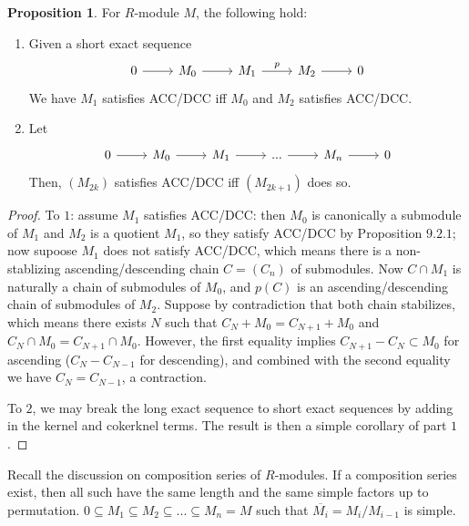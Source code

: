 \documentclass{article}
\theoremstyle{definition}
\theoremstyle{definition}
\theoremstyle{definition}
\newtheorem{proposition}{Proposition}[section]
\theoremstyle{definition}
\theoremstyle{definition}
\theoremstyle{definition}
\theoremstyle{definition}
\begin{document}
\begin{tcolorbox}[colback=blue!5!white,colframe=blue!30!white]
\begin{proposition}
    For $R$-module $M$, the following hold:
\begin{enumerate}
    \item Given a short exact sequence \[\begin{tikzcd}
    0\arrow[r]&M_0\arrow[r]&M_1\arrow[r,"p"]&M_2\arrow[r]&0
    \end{tikzcd}\]
    We have $M_1$ satisfies ACC/DCC iff $M_0$ and $M_2$ satisfies ACC/DCC.
    \item Let \[\begin{tikzcd}
        0\arrow[r]&M_0\arrow[r]&M_1\arrow[r]&...\arrow[r]&M_n\arrow[r]&0
        \end{tikzcd}\]
       Then, $(M_{2k})$ satisfies ACC/DCC iff $(M_{2k+1})$ does so.
\end{enumerate}
\end{proposition}
\end{tcolorbox}
\begin{proof}
    To $1$: assume $M_1$ satisfies ACC/DCC: then $M_0$ is canonically a submodule of $M_1$ and $M_2$ is a quotient $M_1$, so they satisfy ACC/DCC by Proposition $9.2.1$; now supoose $M_1$ does not satisfy ACC/DCC, which means there is a non-stablizing ascending/descending chain $C=(C_n)$ of submodules. Now $C\cap M_1$ is naturally a chain of submodules of $M_0$, and $p(C)$ is an ascending/descending chain of submodules of $M_2$. Suppose by contradiction that both chain stabilizes, which means there exists $N$ such that $C_{N}+M_0=C_{N+1}+M_0$ and $C_{N}\cap M_0=C_{N+1}\cap M_0$. However, the first equality implies $C_{N+1}-C_{N}\subset M_0$ for ascending ($C_{N}-C_{N-1}$ for descending), and combined with the second equality we have $C_N=C_{N-1}$, a contraction. 

    To $2$, we may break the long exact sequence to short exact sequences by adding in the kernel and cokerknel terms. The result is then a simple corollary of part $1$. 

\end{proof}




Recall the discussion on composition series of $R$-modules. If a composition series exist, then all such have the same length and the same simple factors up to permutation. $0\subseteq M_1\subseteq M_2\subseteq ...\subseteq M_n=M$ such that $\overline{M_i}=M_i/M_{i-1}$ is simple. 
\end{document}
